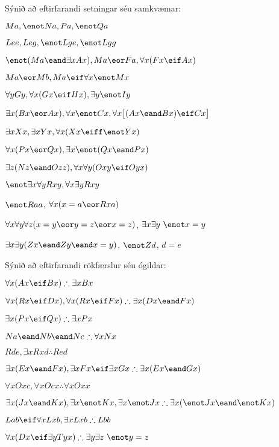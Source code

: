 \problempart
Sýnið að eftirfarandi setningar séu samkvæmar:
\begin{earg}
\item $Ma, \enot Na, Pa, \enot Qa$
\item $Lee, Leg, \enot Lge, \enot Lgg$
\item $\enot (Ma \eand \exists x Ax), Ma \eor Fa, \forall x(Fx \eif Ax)$
\item $Ma \eor Mb, Ma \eif \forall x \enot Mx$
\item $\forall y Gy, \forall x (Gx \eif Hx), \exists y \enot Iy$
\item $\exists x(Bx \eor Ax), \forall x \enot Cx, \forall x\bigl[(Ax \eand Bx) \eif Cx\bigr]$
\item $\exists x Xx, \exists x Yx, \forall x(Xx \eiff \enot Yx)$
\item $\forall x(Px \eor Qx), \exists x\enot(Qx \eand Px)$
\item $\exists z(Nz \eand Ozz), \forall x\forall y(Oxy \eif Oyx)$
\item $\enot \exists x \forall y Rxy, \forall x \exists y Rxy$
\item $\enot Raa$, $\forall x (x=a \eor Rxa)$
\item $\forall x\forall y\forall z(x=y \eor y=z \eor x=z)$, $\exists x\exists y\ \enot x= y$
\item $\exists x\exists y(Zx \eand Zy \eand x=y)$, $\enot Zd$, $d=e$
\end{earg}

\problempart
Sýnið að eftirfarandi rökfærslur séu ógildar:
\begin{earg}
\item $\forall x(Ax \eif Bx) \therefore \exists x Bx$
\item $\forall x(Rx \eif Dx), \forall x(Rx \eif Fx) \therefore \exists x(Dx \eand Fx)$
\item $\exists x(Px\eif Qx) \therefore \exists x Px$
\item $Na \eand Nb \eand Nc \therefore \forall x Nx$
\item $Rde, \exists x Rxd \therefore Red$
\item $\exists x(Ex \eand Fx), \exists x Fx \eif \exists x Gx \therefore \exists x(Ex \eand Gx)$
\item $\forall x Oxc, \forall x Ocx \therefore \forall x Oxx$
\item $\exists x(Jx \eand Kx), \exists x \enot Kx, \exists x \enot Jx \therefore \exists x(\enot Jx \eand \enot Kx)$
\item $Lab \eif \forall x Lxb, \exists x Lxb \therefore Lbb$
\item $\forall x(Dx \eif \exists y Tyx) \therefore \exists y \exists z\ \enot y= z$
\end{earg}

